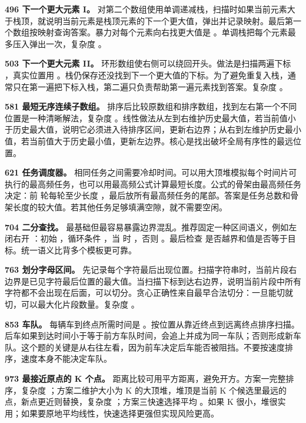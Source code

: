 \textbf{496 下一个更大元素 I。} 对第二个数组使用单调递减栈，扫描时如果当前元素大于栈顶，就说明当前元素是栈顶元素的下一个更大值，弹出并记录映射。最后第一个数组按映射查询答案。暴力对每个元素向右找更大值是 。单调栈把每个元素最多压入弹出一次，复杂度 。

\textbf{503 下一个更大元素 II。} 环形数组使右侧可以绕回开头。做法是扫描两遍下标 ，真实位置用 。栈仍保存还没找到下一个更大值的下标。为了避免重复入栈，通常只在第一遍把下标入栈，第二遍只负责帮助第一遍元素找到答案。复杂度 。

\textbf{581 最短无序连续子数组。} 排序后比较原数组和排序数组，找到左右第一个不同位置是一种清晰解法，复杂度 。线性做法从左到右维护历史最大值，若当前值小于历史最大值，说明它必须进入待排序区间，更新右边界；从右到左维护历史最小值，若当前值大于历史最小值，更新左边界。核心是找出破坏全局有序性的最远位置。

\textbf{621 任务调度器。} 相同任务之间需要冷却时间。可以用大顶堆模拟每个时间片可执行的最高频任务，也可以用最高频公式计算最短长度。公式的骨架由最高频任务决定：前  轮每轮至少长度 ，最后放所有最高频任务的尾部。答案是任务总数和骨架长度的较大值。若其他任务足够填满空隙，就不需要空闲。

\textbf{704 二分查找。} 最基础但最容易暴露边界混乱。推荐固定一种区间语义，例如左闭右开 \code{[left, right)}：初始 ，循环条件 ，当  时 ，否则 。最后检查  是否越界和值是否等于目标。统一语义比背多个模板更可靠。

\textbf{763 划分字母区间。} 先记录每个字符最后出现位置。扫描字符串时，当前片段右边界是已见字符最后位置的最大值。当扫描下标到达右边界，说明当前片段中所有字符都不会出现在后面，可以切分。贪心正确性来自最早合法切分：一旦能切就切，可以最大化片段数量。复杂度 。

\textbf{853 车队。} 每辆车到终点所需时间是 。按位置从靠近终点到远离终点排序扫描。后车如果到达时间小于等于前方车队时间，会追上并成为同一车队；否则形成新车队。这个题的关键是从右往左看，因为前车决定后车能否被阻挡。不要按速度排序，速度本身不能决定车队。

\textbf{973 最接近原点的 K 个点。} 距离比较可用平方距离，避免开方。方案一完整排序，复杂度 ；方案二维护大小为 K 的大顶堆，堆顶是当前 K 个候选里最远的点，新点更近则替换，复杂度 ；方案三快速选择平均 。如果 K 很小，堆很实用；如果要原地平均线性，快速选择更强但实现风险更高。

